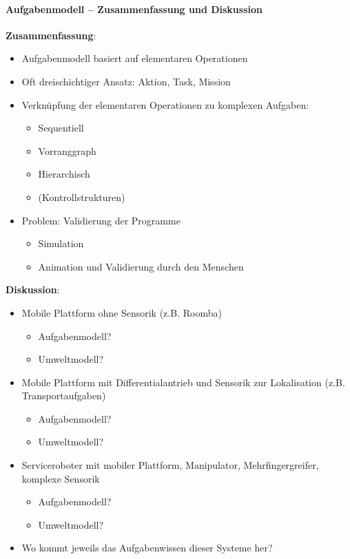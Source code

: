 \paragraph*{Aufgabenmodell -- Zusammenfassung und Diskussion}\phantom\newline
\textbf{Zusammenfassung}:
\begin{itemize}
\item Aufgabenmodell basiert auf elementaren Operationen
\item Oft dreischichtiger Ansatz: Aktion, Task, Mission
\item Verknüpfung der elementaren Operationen zu komplexen Aufgaben:
\begin{itemize}
\item Sequentiell
\item Vorranggraph
\item  Hierarchisch
\item (Kontrollstrukturen)
\end{itemize}
\item Problem: Validierung der Programme
\begin{itemize}
\item Simulation
\item Animation und Validierung durch den Menschen
\end{itemize}
\end{itemize}

\textbf{Diskussion}:
\begin{itemize}
\item Mobile Plattform ohne Sensorik (z.B. Roomba)
\begin{itemize}
\item Aufgabenmodell?
\item Umweltmodell?
\end{itemize}
\item Mobile Plattform mit Differentialantrieb und Sensorik zur Lokalisation (z.B. Transportaufgaben)
\begin{itemize}
\item Aufgabenmodell?
\item Umweltmodell?
\end{itemize}
\item Serviceroboter mit mobiler Plattform, Manipulator, Mehrfingergreifer, komplexe Sensorik\begin{itemize}
\item Aufgabenmodell?
\item Umweltmodell?
\end{itemize}
\item Wo kommt jeweils das Aufgabenwissen dieser Systeme her?
\end{itemize}